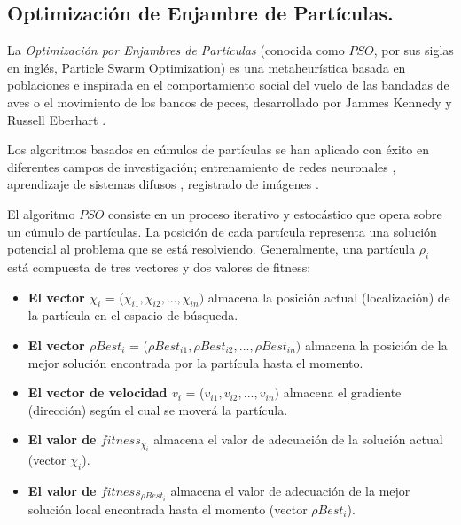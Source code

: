 \subsection{Optimización de Enjambre de Partículas.}
\label{sec:pso}

La \textit{Optimización por Enjambres de Partículas} (conocida como $PSO$, por sus siglas en inglés, Particle Swarm Optimization) es una metaheurística basada en poblaciones e inspirada en el comportamiento social del vuelo de las bandadas de aves o el movimiento de los bancos de peces, desarrollado por Jammes Kennedy y Russell Eberhart \cite{swarmintelligence}.


Los algoritmos basados en cúmulos de partículas se han aplicado con éxito en diferentes campos de investigación; entrenamiento de redes neuronales \cite{neuralnetworks}, aprendizaje de sistemas difusos \cite{fuzzyswarmoptimization}, registrado de imágenes \cite{imageswarmoptimization}.

El algoritmo $PSO$ consiste en un proceso iterativo y estocástico que opera sobre un cúmulo de partículas. La posición de cada partícula representa una solución potencial al problema que se está resolviendo. Generalmente, una partícula $\rho_i$ está compuesta de tres vectores y dos valores de fitness:
\begin{itemize}
    \item \textbf{El vector $\chi_i$} = ($\chi_{i1}, \chi_{i2}, ..., \chi_{in})$ almacena la posición actual (localización) de la partícula en el espacio de búsqueda.
    \item \textbf{El vector $\rho{Best_i}$} = ($\rho{Best}_{i1}, \rho{Best}_{i2}, ..., \rho{Best}_{in})$ almacena la posición de la mejor solución encontrada por la partícula hasta el momento.
    \item \textbf{El vector de velocidad $v_i$} = ($v_{i1}, v_{i2}, ..., v_{in})$ almacena el gradiente (dirección) según el cual se moverá la partícula.
    \item \textbf{El valor de $fitness_{\chi_i}$} almacena el valor de adecuación de la solución actual (vector $\chi_i$).
    \item \textbf{El valor de $fitness_{\rho{Best_i}}$} almacena el valor de adecuación de la mejor solución local encontrada hasta el momento (vector $\rho{Best_i}$).
\end{itemize}


